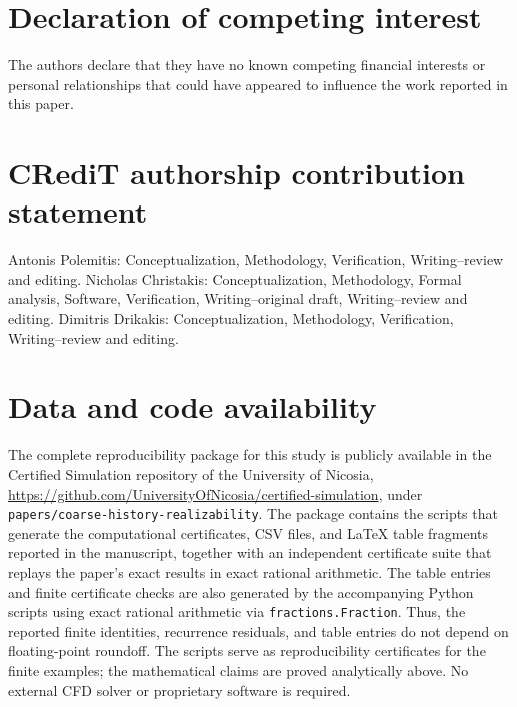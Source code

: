 \documentclass[11pt]{article}
\begin{document}
\section*{Declaration of competing interest}

The authors declare that they have no known competing financial interests or
personal relationships that could have appeared to influence the work
reported in this paper.

\section*{CRediT authorship contribution statement}

Antonis Polemitis: Conceptualization, Methodology, Verification, Writing--review and editing.  Nicholas Christakis:
Conceptualization, Methodology, Formal analysis, Software, Verification,
Writing--original draft, Writing--review and editing.  Dimitris Drikakis:
Conceptualization, Methodology, Verification, Writing--review and editing.

\section*{Data and code availability}

The complete reproducibility package for this study is publicly available in the Certified Simulation repository of the University of Nicosia,
\url{https://github.com/UniversityOfNicosia/certified-simulation}, under
\texttt{papers/coarse-history-realizability}. The package contains the scripts that generate the computational certificates, CSV files, and LaTeX table fragments reported in the manuscript, together with an independent certificate
suite that replays the paper’s exact results in exact rational arithmetic. The table entries and finite certificate checks are also generated by the accompanying Python scripts using exact rational arithmetic via \texttt{fractions.Fraction}. Thus, the reported finite identities, recurrence residuals, and table entries do not depend on floating-point roundoff. The scripts serve as reproducibility certificates for the finite examples; the mathematical claims are proved analytically above. No external CFD solver or proprietary software is required. 



\end{document}
